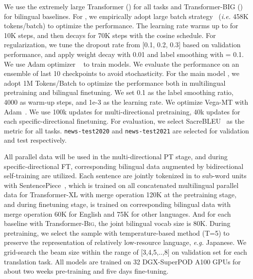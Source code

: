 \documentclass[11pt,a4paper]{article}
\newcommand{\zct}{\color{black}}
\begin{document}
We use the extremely large Transformer () for all tasks and Transformer-\textsc{BIG} () for bilingual baselines.
For , we empirically adopt large batch strategy~\cite{edunov2018understanding} (\textit{i.e.} 458K tokens/batch) to optimize the performance. The learning rate warms up to  for 10K steps, and then decays for 70K steps with the cosine schedule. For regularization, we tune the dropout rate from [0.1, 0.2, 0.3] based on validation performance, and apply weight decay with 0.01 and label smoothing with  = 0.1. We use Adam optimizer ~\citep{kingma2015adam} to train models. We evaluate the performance on an ensemble of last 10 checkpoints to avoid stochasticity.
For the main model , we adopt 1M Tokens/Batch to optimize the performance both in multilingual pretraining and bilingual finetuning. 
We set 0.1 as the label smoothing ratio, 4000 as warm-up steps, and 1e-3 as the learning rate. We optimize Vega-MT with Adam~\cite{kingma2015adam}. We use 100k updates for multi-directional pretraining, 40k updates for each specific-directional finetuning.
For evaluation, we select SacreBLEU~\cite{post-2018-call} as the metric for all tasks. \texttt{news-test2020} and \texttt{news-test2021} are selected for validation and test respectively. 

All parallel data will be used in the multi-directional PT stage, and during specific-directional FT, corresponding bilingual data augmented by bidirectional self-training are utilized.
Each sentence are jointly tokenized in to sub-word units with  SentencePiece~\cite{kudo-richardson-2018-sentencepiece}, which is trained on all concatenated multilingual parallel data for Transformer-\textsc{XL} with merge operation 120K at the pretraining stage, and during finetuning stage, is trained on corresponding bilingual data with merge operation 60K for English and 75K for other languages.
And for each baseline with Transformer-\textsc{Big}, the joint bilingual vocab size is 80K.
During pretraining, we select the sample with temperature-based method (T=5) to preserve the representation of relatively low-resource language, \textit{e.g.} Japanese.
We grid-search the beam size within the range of [3,4,5,..,8] on validation set for each translation task.
All models are trained on 32 DGX-SuperPOD A100 GPUs {\zct for about two weeks pre-training and five days fine-tuning. }
\end{document}
